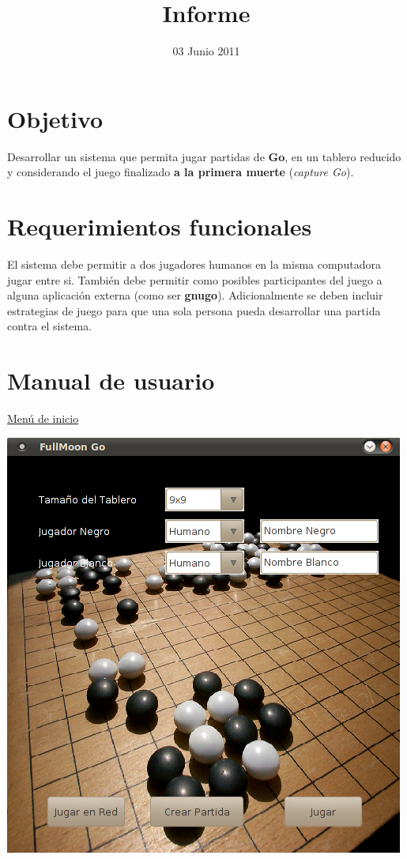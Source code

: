 \documentclass[11pt]{article}
\title{Informe}
\author{}
\date{03 Junio 2011}
\begin{document}
\thispagestyle{empty}
  

\setcounter{tocdepth}{3}
\tableofcontents
\vspace*{1cm}
\section{Objetivo}
\label{sec-1}

  Desarrollar un sistema que permita jugar partidas de \textbf{Go}, en un
  tablero reducido y considerando el juego finalizado \textbf{a la primera   muerte} (\emph{capture Go}).

\section{Requerimientos funcionales}
\label{sec-2}

  El sistema debe permitir a dos jugadores humanos en la misma
  computadora jugar entre si. También debe permitir como posibles
  participantes del juego a alguna aplicación externa (como ser
  \textbf{gnugo}). Adicionalmente se deben incluir estrategias de juego para
  que una sola persona pueda desarrollar una partida contra el
  sistema.

\section{Manual de usuario}
\label{sec-3}
\underline{Men\'u de inicio}
\begin{center}
 \includegraphics[scale=0.55]{./Diagramas/captura_fullmoon.png}
\end{center}
\end{document}
